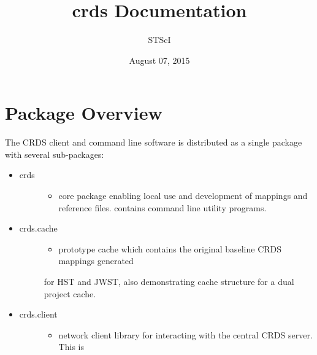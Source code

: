 \documentclass[letterpaper,10pt,english]{sphinxmanual}
\title{crds Documentation}
\date{August 07, 2015}
\author{STScI}
\begin{document}
\maketitle
\tableofcontents
{}\label{index::doc}



\chapter{Package Overview}
\label{installation:package-overview}\label{installation:crds-user-manual}\label{installation::doc}
The CRDS client and command line software is distributed as a single package with
several sub-packages:
\begin{itemize}
\item {} \begin{description}
\item[{crds}] \leavevmode\begin{itemize}
\item {} 
core package enabling local use and development of mappings
and reference files.  contains command line utility programs.

\end{itemize}

\end{description}

\item {} \begin{description}
\item[{crds.cache}] \leavevmode\begin{itemize}
\item {} 
prototype cache which contains the original baseline CRDS mappings generated

\end{itemize}

for HST and JWST,  also demonstrating cache structure for a dual project cache.

\end{description}

\item {} \begin{description}
\item[{crds.client}] \leavevmode\begin{itemize}
\item {} 
network client library for interacting with the central CRDS server.  This is

\end{itemize}


\end{description}
\end{itemize}
\end{document}
